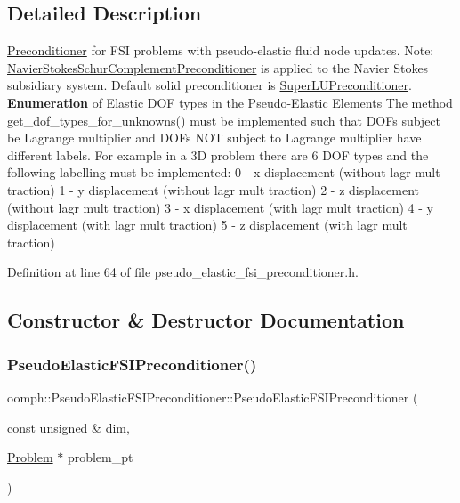 \subsection{Detailed Description}
\hyperlink{classoomph_1_1Preconditioner}{Preconditioner} for F\+SI problems with pseudo-\/elastic fluid node updates. Note\+: \hyperlink{classoomph_1_1NavierStokesSchurComplementPreconditioner}{Navier\+Stokes\+Schur\+Complement\+Preconditioner} is applied to the Navier Stokes subsidiary system. Default solid preconditioner is \hyperlink{classoomph_1_1SuperLUPreconditioner}{Super\+L\+U\+Preconditioner}. {\bfseries Enumeration} of Elastic D\+OF types in the Pseudo-\/\+Elastic Elements The method get\+\_\+dof\+\_\+types\+\_\+for\+\_\+unknowns() must be implemented such that D\+O\+Fs subject be Lagrange multiplier and D\+O\+Fs N\+OT subject to Lagrange multiplier have different labels. For example in a 3D problem there are 6 D\+OF types and the following labelling must be implemented\+: 0 -\/ x displacement (without lagr mult traction) 1 -\/ y displacement (without lagr mult traction) 2 -\/ z displacement (without lagr mult traction) 3 -\/ x displacement (with lagr mult traction) 4 -\/ y displacement (with lagr mult traction) 5 -\/ z displacement (with lagr mult traction) 

Definition at line 64 of file pseudo\+\_\+elastic\+\_\+fsi\+\_\+preconditioner.\+h.



\subsection{Constructor \& Destructor Documentation}
\mbox{\label{classoomph_1_1PseudoElasticFSIPreconditioner_aa3132ef3e4ecd57adf64da72e84b5d9d}} 
\subsubsection{\texorpdfstring{Pseudo\+Elastic\+F\+S\+I\+Preconditioner()}{PseudoElasticFSIPreconditioner()}\hspace{0.1cm}{\footnotesize\ttfamily [1/2]}}
{\footnotesize\ttfamily oomph\+::\+Pseudo\+Elastic\+F\+S\+I\+Preconditioner\+::\+Pseudo\+Elastic\+F\+S\+I\+Preconditioner (\begin{DoxyParamCaption}\item[{const unsigned \&}]{dim,  }\item[{\hyperlink{classoomph_1_1Problem}{Problem} $\ast$}]{problem\+\_\+pt }\end{DoxyParamCaption})\hspace{0.3cm}{\ttfamily [inline]}}



